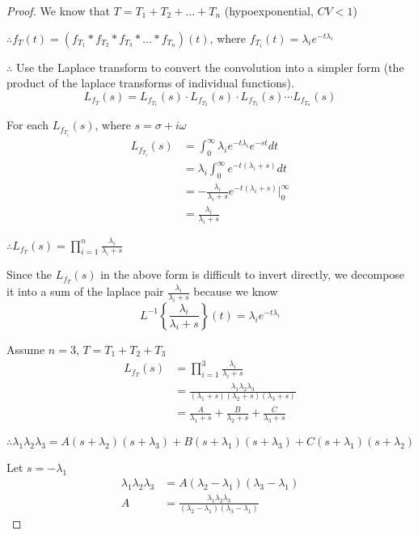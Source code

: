 \documentclass[12pt]{article}
\begin{document}
\begin{proof}

    We know that $T = T_1 + T_2 + \dots + T_n$ (hypoexponential, $CV < 1$) 

    $\therefore f_T(t) = (f_{T_1} * f_{T_2} * f_{T_3} * \dots * f_{T_n}) (t)$, where $f_{T_i} (t) = \lambda_i e^{-t \lambda_i}$

    $\therefore$ Use the Laplace transform to convert the convolution into a simpler form (the product of the laplace transforms of individual functions).
    \[ L_{f_T}(s) = L_{f_{T_1}}(s) \cdot L_{f_{T_2}}(s) \cdot L_{f_{T_3}}(s) \cdots L_{f_{T_n}}(s) \]

    For each $L_{f_{T_i}}(s)$, where $s = \sigma + i \omega$
    \begin{align*}
        L_{f_{T_i}}(s) &= \int_{0}^{\infty} \lambda_i e^{-t \lambda_i} e^{-st} dt \\
        &= \lambda_i \int_{0}^{\infty} e^{-t(\lambda_i + s)} dt \\
        &= -\frac{\lambda_i}{\lambda_i + s} e^{-t(\lambda_i + s)} \bigg|_{0}^{\infty} \\
        &= \frac{\lambda_i}{\lambda_i + s}
    \end{align*}

    $\therefore \displaystyle L_{f_T}(s) = \prod_{i=1}^{n} \frac{\lambda_i}{\lambda_i + s}$

    Since the $L_{f_T}(s)$ in the above form is difficult to invert directly, we decompose it into a sum of the laplace pair $\frac{\lambda_i}{\lambda_i + s}$ because we know
    \[ L^{-1} \left\{ \frac{\lambda_i}{\lambda_i + s}\right\} (t) = \lambda_i e^{-t\lambda_i}\]

    Assume $n=3$, $T = T_1 + T_2 + T_3$
    \begin{align*}
        L_{f_T}(s) &= \prod_{i=1}^{3} \frac{\lambda_i}{\lambda_i + s} \\
        &= \frac{\lambda_1 \lambda_2 \lambda_3}{(\lambda_1 + s) (\lambda_2 + s) (\lambda_3 + s)} \\
        &= \frac{A}{\lambda_1 + s} + \frac{B}{\lambda_2 + s} + \frac{C}{\lambda_3 + s}
    \end{align*}

    $\therefore \lambda_1 \lambda_2 \lambda_3 = A(s+\lambda_2)(s+\lambda_3) + B(s+\lambda_1)(s+\lambda_3) + C(s+\lambda_1)(s+\lambda_2)$

    Let $s = -\lambda_1$
    \begin{align*}
        \lambda_1 \lambda_2 \lambda_3 &= A(\lambda_2 - \lambda_1) (\lambda_3 - \lambda_1) \\
        A &= \frac{\lambda_1 \lambda_2 \lambda_3}{(\lambda_2 - \lambda_1)(\lambda_3 - \lambda_1)}
    \end{align*}


\end{proof}
\end{document}

